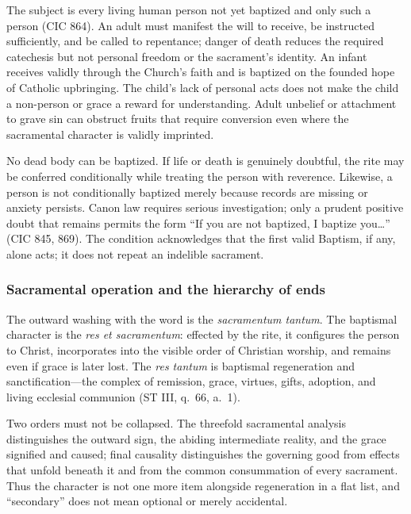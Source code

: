 The subject is every living human person not yet baptized and only such a person (CIC 864). An adult must manifest the will to receive, be instructed sufficiently, and be called to repentance; danger of death reduces the required catechesis but not personal freedom or the sacrament's identity. An infant receives validly through the Church's faith and is baptized on the founded hope of Catholic upbringing. The child's lack of personal acts does not make the child a non-person or grace a reward for understanding. Adult unbelief or attachment to grave sin can obstruct fruits that require conversion even where the sacramental character is validly imprinted.

No dead body can be baptized. If life or death is genuinely doubtful, the rite may be conferred conditionally while treating the person with reverence. Likewise, a person is not conditionally baptized merely because records are missing or anxiety persists. Canon law requires serious investigation; only a prudent positive doubt that remains permits the form ``If you are not baptized, I baptize you\ldots'' (CIC 845, 869). The condition acknowledges that the first valid Baptism, if any, alone acts; it does not repeat an indelible sacrament.

\subsubsection{Sacramental operation and the hierarchy of ends}

The outward washing with the word is the \emph{sacramentum tantum}. The baptismal character is the \emph{res et sacramentum}: effected by the rite, it configures the person to Christ, incorporates into the visible order of Christian worship, and remains even if grace is later lost. The \emph{res tantum} is baptismal regeneration and sanctification---the complex of remission, grace, virtues, gifts, adoption, and living ecclesial communion (ST III, q.~66, a.~1).

Two orders must not be collapsed. The threefold sacramental analysis distinguishes the outward sign, the abiding intermediate reality, and the grace signified and caused; final causality distinguishes the governing good from effects that unfold beneath it and from the common consummation of every sacrament. Thus the character is not one more item alongside regeneration in a flat list, and ``secondary'' does not mean optional or merely accidental.

